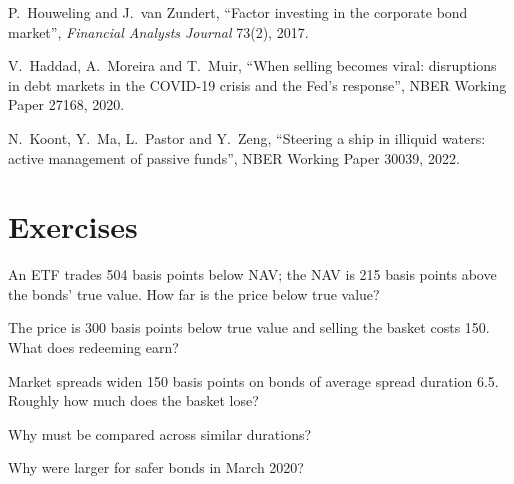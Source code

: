\begin{omsources}
\item P.~Houweling and J.~van Zundert, ``Factor investing in the corporate bond market'', \emph{Financial Analysts Journal} 73(2), 2017.
\item V.~Haddad, A.~Moreira and T.~Muir, ``When selling becomes viral: disruptions in debt markets in the COVID-19 crisis and the Fed's response'',
NBER Working Paper 27168, 2020.
\item N.~Koont, Y.~Ma, L.~Pastor and Y.~Zeng, ``Steering a ship in illiquid waters: active management of passive funds'', NBER Working Paper 30039,
2022.
\end{omsources}

\section{Exercises}

\begin{exercise}[$\star$]\label{exo:s2:systematic-credit-and-bond-etf-arbitrage:1}
An ETF trades 504 basis points below NAV; the NAV is 215 basis points above the bonds' true value. How far is the price below true value?
\end{exercise}

\begin{exercise}[$\star$]\label{exo:s2:systematic-credit-and-bond-etf-arbitrage:2}
The price is 300 basis points below true value and selling the basket costs 150. What does redeeming earn?
\end{exercise}

\begin{exercise}[$\star$]\label{exo:s2:systematic-credit-and-bond-etf-arbitrage:3}
Market spreads widen 150 basis points on bonds of average spread duration 6.5. Roughly how much does the basket lose?
\end{exercise}

\begin{exercise}[$\star\star$]\label{exo:s2:systematic-credit-and-bond-etf-arbitrage:4}
Why must  be compared across similar durations?
\end{exercise}

\begin{exercise}[$\star\star$]\label{exo:s2:systematic-credit-and-bond-etf-arbitrage:5}
Why were  larger for safer bonds in March 2020?
\end{exercise}


